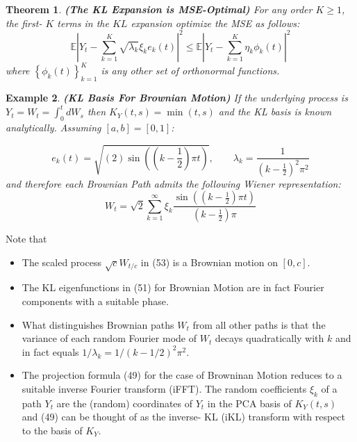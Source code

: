 \documentclass[11pt]{article}
\theoremstyle{plain} %
\newtheorem{theorem}{Theorem}[section]
\newtheorem{example}[theorem]{Example}
\theoremstyle{remark}
\begin{document}
\begin{theorem}\textbf{(The KL Expansion is MSE-Optimal)}
  For any order $K \geq 1$, the first- $K$ terms in the $K L$ expansion optimize
the MSE as follows:
$$
  \mathbb{E}\left|Y_{t}-\sum_{k=1}^{K} \sqrt{\lambda_{k}} \xi_{k} e_{k}(t)\right|^{2} \leq \mathbb{E}\left|Y_{t}-\sum_{k=1}^{K} \eta_{k} \phi_{k}(t)\right|^{2}
$$
where $\left\{\phi_{k}(t)\right\}_{k=1}^{K}$ is any other set of orthonormal
functions.
\end{theorem}

\begin{example}\textbf{(KL Basis For Brownian Motion)}
  If the underlying process is $Y_{t}=W_{t}=\int_{0}^{t} d W_{s}$ then $K_{Y}(t,
  s)=\min (t, s)$ and the KL basis is known analytically. Assuming $[a,b]=[0,1]$:

$$
    e_{k}(t)=\sqrt{(2) \sin \left(\left(k-\frac{1}{2}\right) \pi t\right)}, \qquad
    \lambda_{k} =\frac{1}{\left(k-\frac{1}{2}\right)^{2} \pi^{2}}
$$
and therefore each Brownian Path admits the following Wiener representation:
$$
  W_{t}=\sqrt{2} \sum_{k=1}^{\infty} \xi_{k} \frac{\sin \left(\left(k-\frac{1}{2}\right) \pi t\right)}{\left(k-\frac{1}{2}\right) \pi}
$$
\end{example}

Note that

\begin{itemize}
  \item The scaled process $\sqrt{c} W_{t / c}$ in (53) is a Brownian motion on
        $[0, c]$.

  \item The KL eigenfunctions in (51) for Brownian Motion are in fact Fourier
        components with a suitable phase.

  \item What distinguishes Brownian paths $W_{t}$ from all other paths is that
        the variance of each random Fourier mode of $W_{t}$ decays quadratically with
        $k$ and in fact equals $1 / \lambda_{k}=1 /(k-1 / 2)^{2} \pi^{2}$.

  \item The projection formula (49) for the case of Browninan Motion reduces to
        a suitable inverse Fourier transform (iFFT). The random coefficients $\xi_{k}$
        of a path $Y_{t}$ are the (random) coordinates of $Y_{t}$ in the PCA basis of
        $K_{Y}(t, s)$ and (49) can be thought of as the inverse- $\mathrm{KL}$ (iKL)
        transform with respect to the basis of $K_{Y}$.

\end{itemize}
\end{document}
